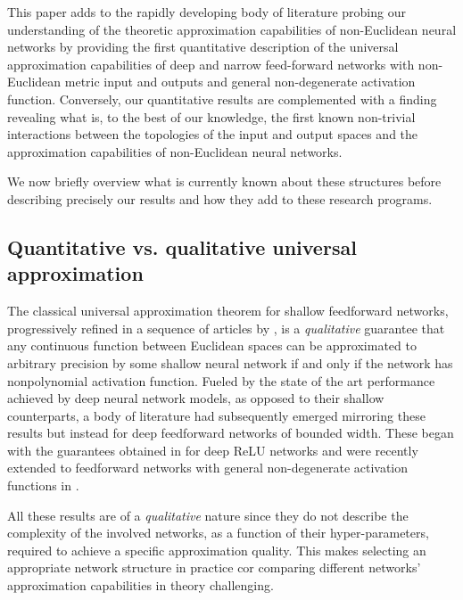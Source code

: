 \documentclass[anon,12pt]{colt2021} %
\begin{document}
This paper adds to the rapidly developing body of literature probing our understanding of the theoretic approximation capabilities of non-Euclidean neural networks by providing the first quantitative description of the universal approximation capabilities of deep and narrow feed-forward networks with non-Euclidean metric input and outputs and general non-degenerate activation function.  Conversely, our quantitative results are complemented with a finding revealing 
what is, to the best of our knowledge, the first known non-trivial interactions between the topologies of the input and output spaces and the approximation capabilities of non-Euclidean neural networks.  

We now briefly overview what is currently known about these structures before describing precisely our results and how they add to these research programs.  

\subsection*{Quantitative vs. qualitative universal approximation}
The classical universal approximation theorem for shallow feedforward networks, progressively refined in a sequence of articles by \cite{Cybenko, Hornik, Leshno, PinkusMLP}, is a \textit{qualitative} guarantee that any continuous function between Euclidean spaces can be approximated to arbitrary precision by some shallow neural network if and only if the network has nonpolynomial activation function.  Fueled by the state of the art performance achieved by deep neural network models, as opposed to their shallow counterparts, a body of literature had subsequently emerged mirroring these results but instead for deep feedforward networks of bounded width.  These began with the guarantees obtained in \cite{disconnected, Hanin, Lu, Park} for deep ReLU networks and were recently extended to feedforward networks with general non-degenerate activation functions in \cite{kidger2019universal}. 

All these results are of a \textit{qualitative} nature since they do not describe the complexity of the involved networks, as a function of their hyper-parameters, required to achieve a specific approximation quality.  This makes selecting an appropriate network structure in practice cor comparing different networks' approximation capabilities in theory challenging.  
\end{document}
